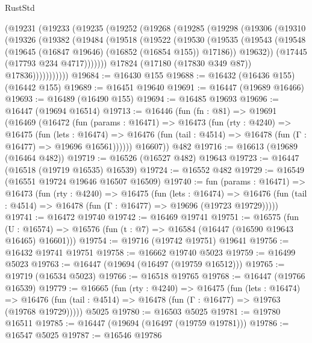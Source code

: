 \begin{lexlean}{RustStd}
\begin{coremodule}
      (@19231
        (@19233
          (@19235
            (@19252
              (@19268
                (@19285
                  (@19298
                    (@19306
                      (@19310
                        (@19326
                          (@19382
                            (@19484
                              (@19518
                                (@19522
                                  (@19530
                                    (@19535
                                      (@19543
                                        (@19548
                                          (@19645 (@16847 @19646) (@16852 (@16854 @155)) @17186))
                                        @19632))
                                    (@17445 (@17793 @234 @4717)))))))
                          @17824
                          (@17180 (@17830 @349 @87))
                          @17836)))))))))))
@19684 := @16430 @155
@19688 := @16432 (@16436 @155) (@16442 @155)
@19689 := @16451 @19640
@19691 := @16447 (@19689 @16466)
@19693 := @16489 (@16490 @155)
@19694 := @16485 @19693
@19696 := @16447 (@19694 @16514)
@19713 := @16446
    (fun (fn : @81) =>
    @19691
      (@16469
        (@16472
          (fun (params : @16471) =>
          @16473
            (fun (rty : @4240) =>
            @16475
              (fun (lets : @16474) =>
              @16476 (fun (tail : @4514) => @16478 (fun (Γ : @16477) => @19696 @16561))))))
        @16607))
    @482
@19716 := @16613 (@19689 (@16464 @482))
@19719 := @16526 (@16527 @482) @19643
@19723 := @16447 (@16518 (@19719 @16535) @16539)
@19724 := @16552 @482
@19729 := @16549 (@16551 @19724 @19646 @16507 @16509)
@19740 := fun (params : @16471) =>
  @16473
    (fun (rty : @4240) =>
    @16475
      (fun (lets : @16474) =>
      @16476 (fun (tail : @4514) => @16478 (fun (Γ : @16477) => @19696 (@19723 @19729)))))
@19741 := @16472 @19740
@19742 := @16469 @19741
@19751 := @16575
    (fun (U : @16574) => @16576 (fun (t : @7) => @16584 (@16447 (@16590 @19643 @16465) @16601)))
@19754 := @19716 (@19742 @19751) @19641
@19756 := @16432 @19741 @19751
@19758 := @16662 @19740 @5023
@19759 := @16499 @5023
@19763 := @16447 (@19694 (@16497 (@19759 @16512)))
@19765 := @19719 (@16534 @5023)
@19766 := @16518 @19765
@19768 := @16447 (@19766 @16539)
@19779 := @16665
    (fun (rty : @4240) =>
    @16475
      (fun (lets : @16474) =>
      @16476 (fun (tail : @4514) => @16478 (fun (Γ : @16477) => @19763 (@19768 @19729)))))
    @5025
@19780 := @16503 @5025
@19781 := @19780 @16511
@19785 := @16447 (@19694 (@16497 (@19759 @19781)))
@19786 := @16547 @5025
@19787 := @16546 @19786

\end{coremodule}
\end{lexlean}
